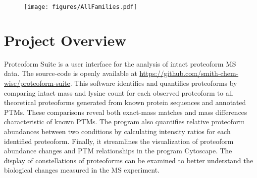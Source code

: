 


\begin{figure}[ht]
\texttt{[image: figures/AllFamilies.pdf]}
\end{figure}

\section*{Project Overview}

Proteoform Suite is a user interface for the analysis of intact proteoform MS data. The source-code is openly available at \url{https://github.com/smith-chem-wisc/proteoform-suite}. This software identifies and quantifies proteoforms by comparing intact mass and lysine count for each observed proteoform to all theoretical proteoforms generated from known protein sequences and annotated PTMs. These comparisons reveal both exact-mass matches and mass differences characteristic of known PTMs. The program also quantifies relative proteoform abundances between two conditions by calculating intensity ratios for each identified proteoform. Finally, it streamlines the visualization of proteoform abundance changes and PTM relationships in the program Cytoscape. The display of constellations of proteoforms can be examined to better understand the biological changes measured in the MS experiment.
\\

